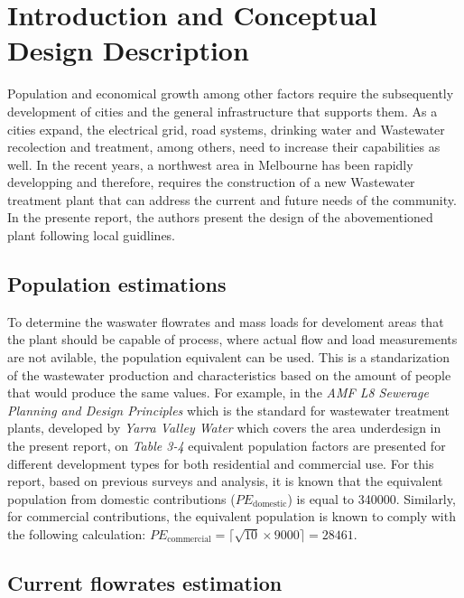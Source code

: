 \documentclass[12pt]{article}
\begin{document}
\setcounter{page}{1}
\sloppy

\section{Introduction and Conceptual Design Description}
Population and economical growth among other factors require the subsequently development of cities and the
general infrastructure that supports them. As a cities expand, the electrical grid, road systems, drinking water and Wastewater
recolection and treatment, among others, need to increase their capabilities as well. In the recent years, a northwest area in
Melbourne has been rapidly developping and therefore, requires the construction of a new Wastewater treatment plant that can 
address the current and future needs of the community. In the presente report, the authors present the design of the abovementioned
plant following local guidlines.

\subsection{Population estimations}

To determine the waswater flowrates and mass loads for develoment areas that the plant should be capable of process, 
where actual flow and load
measurements are not avilable, the population equivalent can be used. This is a standarization of the wastewater production
and characteristics based on the amount of people that would produce the same values. For example, in the
\textit{AMF L8 Sewerage Planning and Design Principles}
 which is the standard for wastewater treatment plants, developed by 
 \textit{Yarra Valley Water}
  which covers the area underdesign in the present report, on 
\textit{Table 3-4}
 equivalent population factors are presented for different development types for both residential and commercial use. 
For this report, based on previous surveys and analysis, it is known that the equivalent population from 
domestic contributions (\(PE_{\mathrm{domestic}}\)) is equal to 340000.
Similarly, for commercial contributions, the equivalent population is known to comply with the 
following calculation: 
\(PE_{\mathrm{commercial}}
= \bigl\lceil \sqrt{\text{10}}\times 9000 \bigr\rceil
=  \text{28461} \).

\subsection{Current flowrates estimation}
\label{sec:current_flowrates}
\end{document}
